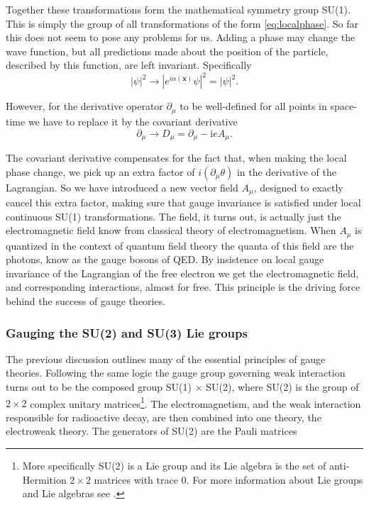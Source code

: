 Together these transformations form the mathematical symmetry group SU(1). This is simply the group of all transformations of the form \eqref{eq:localphase}.  So far this does not seem to pose any problems for us. Adding a phase may change the wave function, but all predictions made about the position of the particle, described by this function, are left invariant. Specifically
\begin{equation}
	|\psi|^2 \rightarrow |e^{i\alpha(\mathbf{x})} \psi|^2 = |\psi|^2.
\end{equation}

However, for the derivative operator $\partial_\mu$ to be well-defined for all points in space-time we have to replace it by the covariant derivative
\begin{equation} \label{eq:covariant}
	\partial_\mu \rightarrow D_\mu = \partial_\mu - \textrm{i}e A_\mu.
\end{equation}

The covariant derivative compensates for the fact that, when making the local phase change, we pick up an extra factor of $i (\partial_\mu \theta)$ in the derivative of the Lagrangian. So we have introduced a new vector field $A_\mu$, designed to exactly cancel this extra factor, making sure that gauge invariance is satisfied under local continuous SU(1) transformations. The field, it turns out, is actually just the electromagnetic field know from classical theory of electromagnetism. When $A_\mu$ is quantized in the context of quantum field theory the quanta of this field are the photons, know as the gauge bosons of QED. By insistence on local gauge invariance of the Lagrangian of the free electron we get the electromagnetic field, and corresponding interactions, almost for free. This principle is the driving force behind the success of gauge theories.

\subsubsection{Gauging the SU(2) and SU(3) Lie groups} \label{sec:su2andsu3}
The previous discussion outlines many of the essential principles of gauge theories. Following the same logic the gauge group governing weak interaction turns out to be the composed group SU(1) $\times$ SU(2), where SU(2) is the group of $2 \times 2$ complex unitary matrices\footnote{More specifically SU(2) is a Lie group and its Lie algebra is the set of anti-Hermition $2 \times 2$ matrices with trace 0. For more information about Lie groups and Lie algebras see  \cite{fulton1991rtf}.}. The electromagnetism, and the weak interaction responsible for radioactive decay, are then combined into one theory, the electroweak theory. The generators of SU(2) are the Pauli matrices

